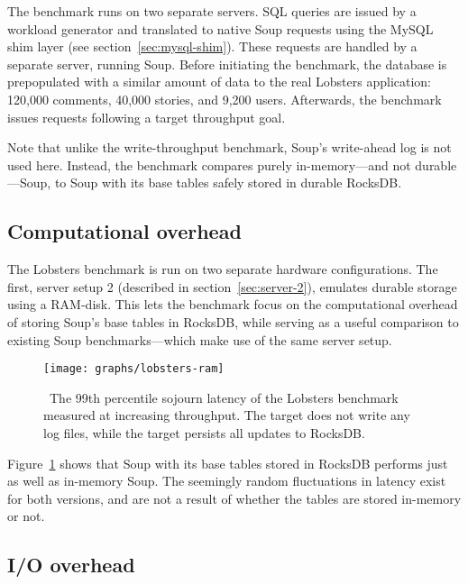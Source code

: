 
The benchmark runs on two separate servers. SQL queries are issued by a workload
generator and translated to native Soup requests using the MySQL shim layer (see
section~\ref{sec:mysql-shim}). These requests are handled by a separate server,
running Soup. Before initiating the benchmark, the database is prepopulated with
a similar amount of data to the real Lobsters application: 120,000 comments,
40,000 stories, and 9,200 users. Afterwards, the benchmark issues requests
following a target throughput goal.

Note that unlike the write-throughput benchmark, Soup's write-ahead log is not
used here. Instead, the benchmark compares purely in-memory---and not
durable---Soup, to Soup with its base tables safely stored in durable RocksDB.\@

\subsection{Computational overhead}

The Lobsters benchmark is run on two separate hardware configurations. The
first, server setup 2 (described in section~\ref{sec:server-2}), emulates
durable storage using a
RAM-disk.
This lets the benchmark focus on the computational overhead of storing Soup's
base tables in RocksDB, while serving as a useful comparison to existing Soup
benchmarks---which make use of the same server setup.

\begin{figure}[H]
  \texttt{[image: graphs/lobsters-ram]}
  \caption{\
    The 99th percentile sojourn latency of the Lobsters benchmark measured at
    increasing throughput. The \code{soup} target does not write any log files,
    while the \code{rocksdb\_soup} target persists all updates to RocksDB.
  }\label{fig:lobsters-ram}
\end{figure}

Figure~\ref{fig:lobsters-ram} shows that Soup with its base tables stored in
RocksDB performs just as well as in-memory Soup. The seemingly random
fluctuations in latency exist for both versions, and are not a result of whether
the tables are stored in-memory or not.

\subsection{I/O overhead}

